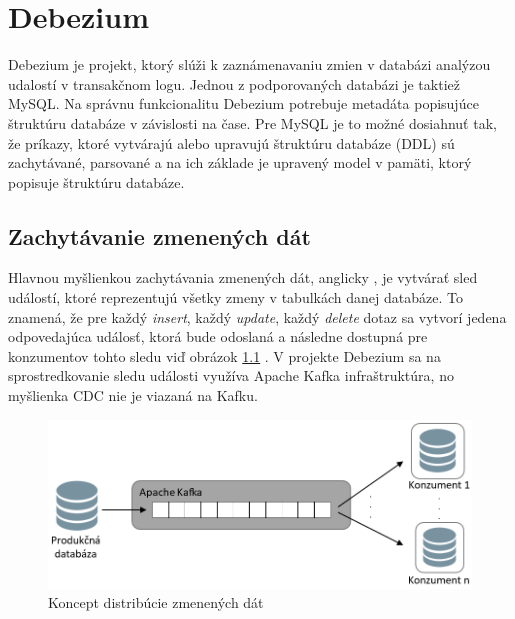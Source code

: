 \chapter{Debezium}
Debezium\cite{Debezium} je projekt, ktorý slúži k zaznámenavaniu zmien v databázi analýzou udalostí v transakčnom logu. Jednou z podporovaných databázi je taktiež MySQL.
Na správnu funkcionalitu Debezium potrebuje metadáta popisujúce štruktúru databáze v závislosti na čase. Pre MySQL je to možné dosiahnuť tak, že príkazy, ktoré vytvárajú alebo upravujú štruktúru databáze (DDL) sú zachytávané, parsované a na ich základe je upravený model v pamäti, ktorý popisuje štruktúru databáze. 

\section{Zachytávanie zmenených dát}
Hlavnou myšlienkou zachytávania zmenených dát, anglicky , je vytvárať sled událostí, ktoré reprezentujú všetky zmeny v tabulkách danej databáze. To znamená, že pre každý \textit{insert}, každý \textit{update}, každý \textit{delete} dotaz sa vytvorí jedena odpovedajúca událosť, ktorá bude odoslaná a následne dostupná pre konzumentov tohto sledu viď obrázok \ref{fig:CDC} \cite{debezium:devoxx}. V projekte Debezium sa na sprostredkovanie sledu události využíva Apache Kafka \cite{Kafka} infraštruktúra, no myšlienka CDC nie je viazaná na Kafku.

\begin{figure}[H]
\begin{center}
\includegraphics[width=15cm]{figures/CDC_1.PNG}
\caption{Koncept distribúcie zmenených dát}
\label{fig:CDC}
\end{center}
\end{figure}

